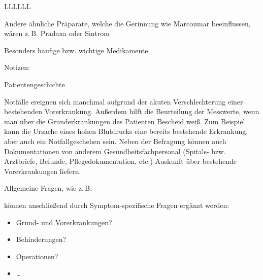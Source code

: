 {\begin{tabulary}{\linewidth}{LLLLLL}
\\\addlinespace\bottomrule
\end{tabulary}

{\noindent\footnotesize Andere ähnliche Präparate, welche die Gerinnung wie Marcoumar beeinflussen, wären z.\,B. Pradaxa{\texttrademark} oder Sintrom{\texttrademark}}}
{Besonders häufige bzw. wichtige Medikamente}
{}

Notizen: \TakeNotesLarge



\TextSlide
{Patientengeschichte}
{Notfälle ereignen sich manchmal aufgrund der akuten
Verschlechterung einer bestehenden Vorerkrankung. Außerdem
hilft die Beurteilung der Messwerte, wenn man über die
Grunderkrankungen des Patienten Bescheid weiß. Zum Beispiel
kann die Ursache eines hohen Blutdrucks eine bereits
bestehende Erkrankung, aber auch ein Notfallgeschehen sein.
Neben der Befragung können auch Dokumentationen von anderem
Gesundheitsfachpersonal (Spitals- bzw. Arztbriefe, Befunde,
Pflegedokumentation, etc.) Auskunft über bestehende
Vorerkrankungen liefern.


Allgemeine Fragen,
wie z.\,B.
\begin{quote}
    
\end{quote}
können anschließend durch Symptom-spezifische Fragen ergänzt
werden:
\begin{quote}
    
    
\end{quote}}
{
\begin{itemize}
  \item Grund- und Vorerkrankungen?
  \item Behinderungen?
  \item Operationen?
  \item \ldots
\end{itemize}
}
{}
{}
{}



